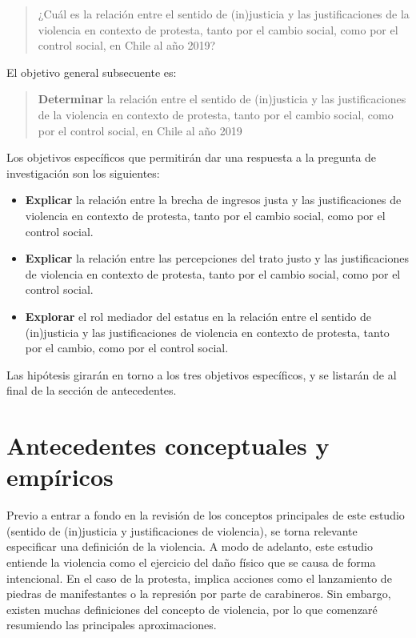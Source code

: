 \documentclass[12pt,twoside]{templates/facsothesis}
\begin{document}
\begin{quote}
¿Cuál es la relación entre el sentido de (in)justicia y las justificaciones de la violencia en contexto de protesta, tanto por el cambio social, como por el control social, en Chile al año 2019?
\end{quote}

El objetivo general subsecuente es:

\begin{quote}
\textbf{Determinar} la relación entre el sentido de (in)justicia y las justificaciones de la violencia en contexto de protesta, tanto por el cambio social, como por el control social, en Chile al año 2019
\end{quote}

Los objetivos específicos que permitirán dar una respuesta a la pregunta de investigación son los siguientes:

\begin{itemize}
\item
  \textbf{Explicar} la relación entre la brecha de ingresos justa y las justificaciones de violencia en contexto de protesta, tanto por el cambio social, como por el control social.
\item
  \textbf{Explicar} la relación entre las percepciones del trato justo y las justificaciones de violencia en contexto de protesta, tanto por el cambio social, como por el control social.
\item
  \textbf{Explorar} el rol mediador del estatus en la relación entre el sentido de (in)justicia y las justificaciones de violencia en contexto de protesta, tanto por el cambio, como por el control social.
\end{itemize}

Las hipótesis girarán en torno a los tres objetivos específicos, y se listarán de al final de la sección de antecedentes.

\hypertarget{antecedentes-conceptuales-y-empuxedricos}{%
\chapter{Antecedentes conceptuales y empíricos}\label{antecedentes-conceptuales-y-empuxedricos}}

Previo a entrar a fondo en la revisión de los conceptos principales de este estudio (sentido de (in)justicia y justificaciones de violencia), se torna relevante especificar una definición de la violencia. A modo de adelanto, este estudio entiende la violencia como el ejercicio del daño físico que se causa de forma intencional. En el caso de la protesta, implica acciones como el lanzamiento de piedras de manifestantes o la represión por parte de carabineros. Sin embargo, existen muchas definiciones del concepto de violencia, por lo que comenzaré resumiendo las principales aproximaciones.
\end{document}

